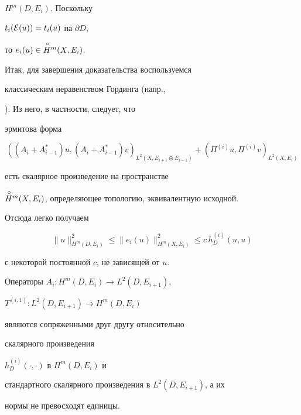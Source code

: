 \begin{pf}
$H^m (D,E_i)$. Поскольку


$t_i({\cal E} (u))=t_i (u)$ на $\partial D$,


то $e_i(u) \in \overset{\,\circ}{H}{}{}^{m} (X, E_i)$.





Итак, для завершения доказательства воспользуемся


классическим неравенством Гординга (напр.,


\cite{VishX}). Из него, в частности, следует, что


эрмитова форма


$$


((A_i+A^*_{i-1}) u,


(A_i+A^*_{i-1}) v)_{L^2 (X,E_{i+1}\oplus E_{i-1})} + (


\Pi^{(i)} u,\Pi^{(i)} v)_{L^2 (X,E_i)}


$$


есть скалярное произведение на пространстве


$\overset{\,\circ}{H}{}{}^{m} (X, E_i)$, определяющее топологию, эквивалентную исходной.


Отсюда легко получаем


$$


\| u \|^2_{H^m (D,E_i)} \leq


\| e_i (u) \|^2_{H^m (X,E_i)} \leq


c \, h^{(i)}_D (u,u) $$


с некоторой постоянной $c$, не зависящей от $u$.


\end{pf}








\begin{cor}


\label{c.6.main.i}


Операторы $A_i:H^{m} (D, E_i)\to L^{2} (D, E_{i+1})$,


$T^{(i,1)}:L^{2} (D, E_{i+1})\to H^{m} (D, E_i)$


являются сопряженными друг другу относительно


скалярного произведения


$h^{(i)}_{D} (\cdot,\cdot)$ в $H^{m} (D, E_i)$ и


стандартного скалярного произведения в $L^2 (D,E_{i+1})$, а их


нормы не превосходят единицы.


\end{cor}








